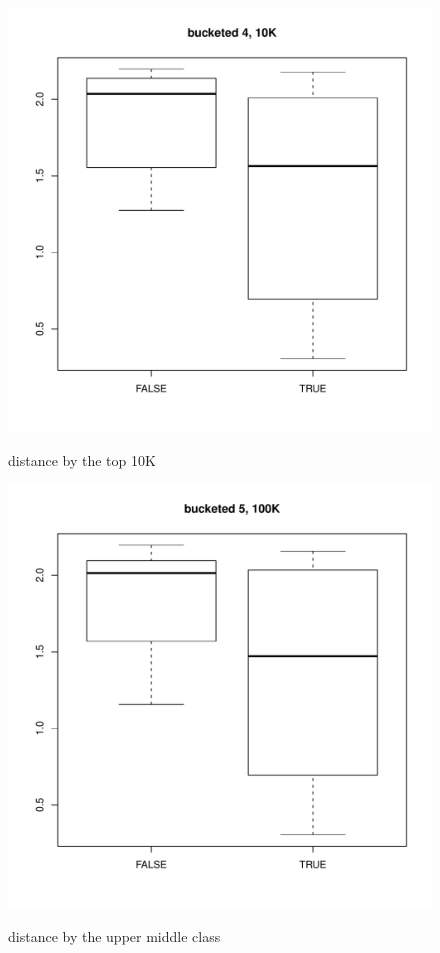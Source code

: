 \documentclass[10pt,oneside]{memoir}
\begin{document}
\begin{Spacing}{2}
\begin{figure}[ht]
\centering
\includegraphics[scale=0.4]{figures/boxplots/boxplot-x4-cb}
\label{figure:boxplot-x4}
\caption{distance by the top 10K}
\endminipage\hfill%
%
\centering
\includegraphics[scale=0.4]{figures/boxplots/boxplot-x5-cb}
\label{figure:boxplot-x5}
\caption{distance by the upper middle class}
\endminipage


\end{figure}
\end{Spacing}
\end{document}
